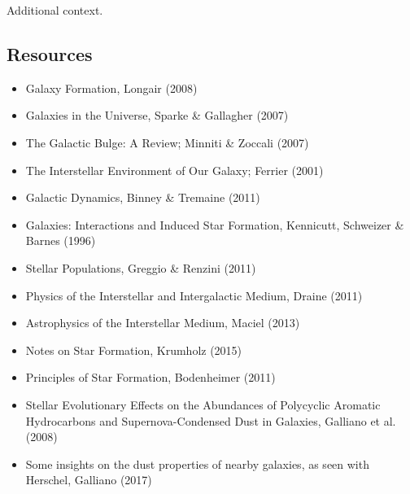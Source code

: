 \documentclass[a4paper,10pt]{article}
\begin{document}
Additional context.


\newpage
\subsection{Resources}

\begin{itemize}
    \item Galaxy Formation, Longair (2008)
    \item Galaxies in the Universe, Sparke \& Gallagher (2007)
    \item The Galactic Bulge: A Review; Minniti \& Zoccali (2007)
    \item The Interstellar Environment of Our Galaxy; Ferrier (2001)
    \item Galactic Dynamics, Binney \& Tremaine (2011)
    \item Galaxies: Interactions and Induced Star Formation, Kennicutt, Schweizer \& Barnes (1996)
    \item Stellar Populations, Greggio \& Renzini (2011)
    \item Physics of the Interstellar and Intergalactic Medium, Draine (2011)
    \item Astrophysics of the Interstellar Medium, Maciel (2013)
    \item Notes on Star Formation, Krumholz (2015)
    \item Principles of Star Formation, Bodenheimer (2011)
    \item Stellar Evolutionary Effects on the Abundances of Polycyclic Aromatic Hydrocarbons and Supernova-Condensed Dust in Galaxies, Galliano et al. (2008)
    \item Some insights on the dust properties of nearby galaxies, as seen with Herschel, Galliano (2017)
\end{itemize}
\end{document}

